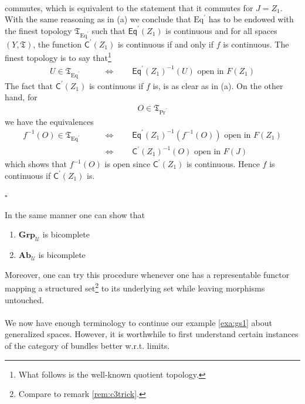 \begin{prf}
\begin{enumerate}
\[\begin{tikzcd}[sep=large]
\end{tikzcd}
\]
commutes, which is equivalent to the statement that it commutes for $J = Z_{1}$.
With the same reasoning as in (a) we conclude that $\mathrm{Eq}^{\prime}$ has to be endowed with the finest topology $\mathfrak{T}_{\mathrm{Eq}^{\prime}}$ such that $\mathsf{Eq}^{\prime}(Z_{1})$ is continuous and for all spaces $(Y,\mathfrak{T})$, the function $\mathsf{C}^{\prime}(Z_{1})$ is continuous if and only if $f$ is continuous.
The finest topology is to say that\footnote{What follows is the well-known quotient topology.}
\begin{align*}
  U
  \in
  \mathfrak{T}_{\mathrm{Eq}^{\prime}}
  \qquad
  &\Leftrightarrow
  \qquad
  \mathsf{Eq}^{\prime}(Z_{1})^{-1}
  (U)
  \text{ open in }
  F(Z_{1})
\end{align*}
The fact that $\mathsf{C}^{\prime}(Z_{1})$ is continuous if $f$ is, is as clear as in (a).
On the other hand, for
\begin{align*}
  O
  \in
  \mathfrak{T}_{\mathrm{Pr}^{\prime}}
\end{align*}
we have the equivalences
\begin{align*}
  f^{-1}(O)
  \in
  \mathfrak{T}_{\mathrm{Eq}^{\prime}}
  \qquad
  &\Leftrightarrow
  \qquad
  \mathsf{Eq}^{\prime}(Z_{1})^{-1}
  \left(
    f^{-1}(O)
  \right)
  \text{ open in }
  F(Z_{1})
  \\
  &\Leftrightarrow
  \qquad
  \mathsf{C}^{\prime}(Z_{1})^{-1}
  (O)
  \text{ open in }
  F(J)
\end{align*}
which shows that $f^{-1}(O)$ is open since $\mathsf{C}^{\prime}(Z_{1})$ is continuous.
Hence $f$ is continuous if $\mathsf{C}^{\prime}(Z_{1})$ is.
\end{enumerate}
\phantom{proven}
\hfill
$\square$
\end{prf}
In the same manner one can show that
\begin{enumerate}
\item[$\bullet$]
$\mathbf{Grp}_{\mathcal{U}}$ is bicomplete
\item[$\bullet$]
$\mathbf{Ab}_{\mathcal{U}}$ is bicomplete
\end{enumerate}
Moreover, one can try this procedure whenever one has a representable functor mapping a structured set\footnote{Compare to remark \ref{rem:c3trick}.} to its underlying set while leaving morphisms untouched.
\\\\
We now have enough terminology to continue our example \ref{exa:gs1} about generalized spaces.
However, it is worthwhile to first understand certain instances of the category of bundles better w.r.t. limits.
